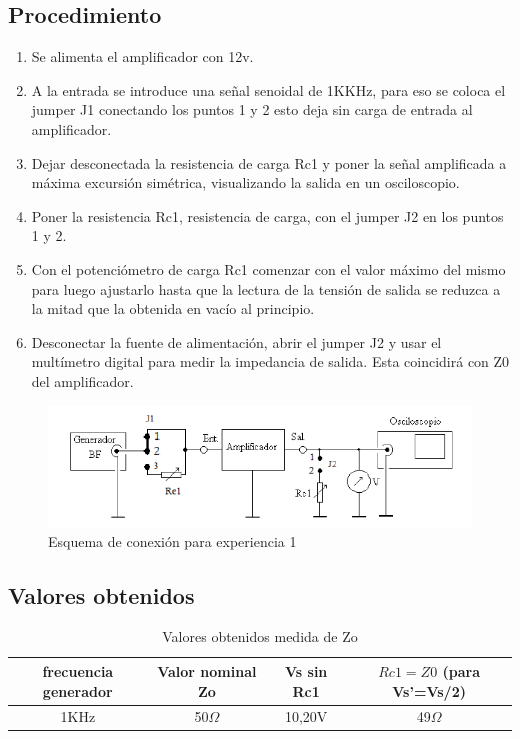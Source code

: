 \documentclass[12pt, letterpaper]{article}
\begin{document}
\subsection{Procedimiento}
\begin{enumerate}
    \item Se alimenta el amplificador con 12v.
    \item A la entrada se introduce una señal senoidal de 1KKHz, para eso se coloca el jumper J1 conectando los puntos 1 y 2 esto deja sin carga de entrada al amplificador.
    \item Dejar desconectada la resistencia de carga Rc1 y poner la señal amplificada a máxima excursión simétrica, visualizando la salida en  un osciloscopio.
    \item Poner la resistencia Rc1, resistencia de carga, con el jumper J2 en los puntos 1 y 2.
    \item  Con el potenciómetro de carga Rc1 comenzar con el valor máximo del mismo para luego ajustarlo hasta que la lectura de la tensión de salida se reduzca a la mitad que la obtenida en vacío al principio.
    \item Desconectar la fuente de alimentación, abrir el jumper J2 y usar el multímetro digital para medir la impedancia de salida. Esta coincidirá con Z0 del amplificador.
      
\end{enumerate}
\begin{figure}[H]
	\centering
	\includegraphics{imagenes/esquma_conec_E1.png}
	\caption{Esquema de conexión para experiencia 1}
    \label{fig:con_E1}
\end{figure}


\subsection{Valores obtenidos}

\begin{table}[H]
    \centering
    \caption{Valores obtenidos medida de Zo}
    \begin{tabular}{|c|c|c|c|}\hline
     frecuencia generador  & Valor nominal Zo & Vs sin Rc1 & $Rc1=Z0$ (para Vs'=Vs/2) \\\hline
     1KHz  & 50$\Omega$ & 10,20V & 49$\Omega$   \\ \hline   
    \end{tabular}
    \label{tab:Zo}
\end{table}
\end{document}
